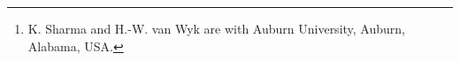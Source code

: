 \author{Kirti Sharma and Hans-Werner van Wyk%
\thanks{K. Sharma and H.-W. van Wyk are with Auburn University, Auburn, Alabama, USA.}%
}
